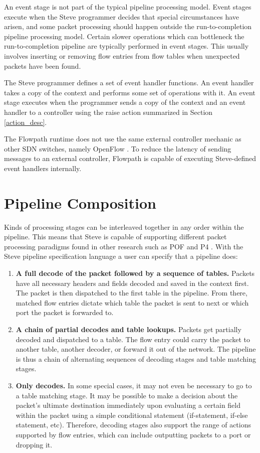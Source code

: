 An event stage is not part of the typical pipeline processing model.
Event stages execute when the Steve programmer decides that special
circumstances have arisen, and some packet processing should happen outside the
run-to-completion pipeline processing model. Certain slower operations which can
bottleneck the run-to-completion pipeline are typically performed in event
stages. This usually involves inserting or removing flow entries from flow
tables when unexpected packets have been found.

The Steve programmer defines a set of event handler functions. An event handler
takes a copy of the context and performs some set of operations with it. An
event stage executes when the programmer sends a copy of the context and an
event handler to a controller using the raise action summarized in Section
\ref{action_desc}.

The Flowpath runtime does not use the same external controller mechanic as other SDN switches, namely OpenFlow \cite{openflow_spec}. To reduce the latency of sending messages to an external controller, Flowpath is capable of executing Steve-defined event handlers internally.

\section{Pipeline Composition} \label{pipeline_comp_desc}

Kinds of processing stages can be interleaved together in any order within the
pipeline. This means that Steve is capable of supporting different packet
processing paradigms found in other research such as POF \cite{pof, pof_fis,
pof_impl} and P4 \cite{p4_spec, p4_spec2}. With the Steve pipeline specification
language a user can specify that a pipeline does:

\begin{enumerate} \item \textbf{A full decode of the packet followed by a
sequence of tables.} Packets have all necessary headers and fields decoded and
saved in the context first. The packet is then dispatched to the first table in
the pipeline. From there, matched flow entries dictate which table the packet is
sent to next or which port the packet is forwarded to.

\item \textbf{A chain of partial decodes and table lookups.} Packets get
partially decoded and dispatched to a table. The flow entry could carry the
packet to another table, another decoder, or forward it out of the network. The
pipeline is thus a chain of alternating sequences of decoding stages and table
matching stages. \item \textbf{Only decodes.} In some special cases, it may not
even be necessary to go to a table matching stage. It may be possible to make a
decision about the packet’s ultimate destination immediately upon evaluating a
certain field within the packet using a simple conditional statement
(if-statement, if-else statement, etc). Therefore, decoding stages also support
the range of actions supported by flow entries, which can include outputting
packets to a port or dropping it. \end{enumerate}


